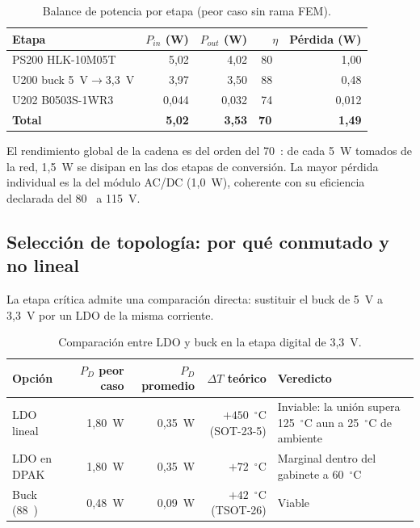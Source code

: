 \documentclass[11pt,a4paper]{article}
\newcommand{\pct}{\text{\char37}}
\begin{document}
\begin{table}[H]
\centering
\caption{Balance de potencia por etapa (peor caso sin rama FEM).}
\label{tab:cadena}
\small
\begin{tabularx}{\textwidth}{@{}X r r r r@{}}
\toprule
\textbf{Etapa} & \textbf{$P_{in}$ (W)} & \textbf{$P_{out}$ (W)} & \textbf{$\eta$} & \textbf{Pérdida (W)} \\
\midrule
PS200 HLK-10M05T & 5,02 & 4,02 & 80~\pct & 1,00 \\
U200 buck 5~V$\to$3,3~V & 3,97 & 3,50 & 88~\pct & 0,48 \\
U202 B0503S-1WR3 & 0,044 & 0,032 & 74~\pct & 0,012 \\
\midrule
\textbf{Total} & \textbf{5,02} & \textbf{3,53} & \textbf{70~\pct} & \textbf{1,49} \\
\bottomrule
\end{tabularx}
\end{table}

\noindent El rendimiento global de la cadena es del orden del 70~\pct{}: de cada
5~W tomados de la red, 1,5~W se disipan en las dos etapas de conversión. La
mayor pérdida individual es la del módulo AC/DC (1,0~W), coherente con su
eficiencia declarada del 80~\pct{} a 115~V.

\subsection{Selección de topología: por qué conmutado y no lineal}
\label{sec:topologia}

La etapa crítica admite una comparación directa: sustituir el buck de 5~V a
3,3~V por un LDO de la misma corriente.

\begin{table}[H]
\centering
\caption{Comparación entre LDO y buck en la etapa digital de 3,3~V.}
\label{tab:ldo}
\small
\begin{tabularx}{\textwidth}{@{}l r r r X@{}}
\toprule
\textbf{Opción} & \textbf{$P_D$ peor caso} & \textbf{$P_D$ promedio} & \textbf{$\Delta T$ teórico} & \textbf{Veredicto} \\
\midrule
LDO lineal & 1,80~W & 0,35~W & $+450$~$^\circ$C (SOT-23-5) & Inviable: la unión supera 125~$^\circ$C aun a 25~$^\circ$C de ambiente \\
LDO en DPAK & 1,80~W & 0,35~W & $+72$~$^\circ$C & Marginal dentro del gabinete a 60~$^\circ$C \\
Buck (88~\pct) & 0,48~W & 0,09~W & $+42$~$^\circ$C (TSOT-26) & Viable \\
\bottomrule
\end{tabularx}
\end{table}
\end{document}
